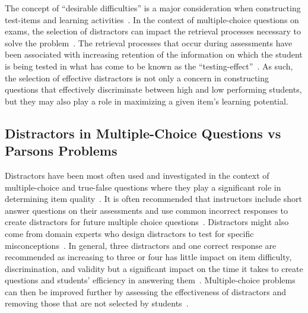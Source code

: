 \documentclass[authorversion,nonacm]{acmart}
\begin{document}
The concept of ``desirable difficulties'' is a major consideration when
constructing test-items and learning activities~\cite{bjork2011making,
bjork2014multiple}.  In the context of multiple-choice questions on exams, the
selection of distractors can impact the retrieval processes necessary to solve
the problem~\cite{little2015optimizing}. The retrieval processes that occur 
during assessments have been associated with increasing retention of the
information on which the student is being tested in what has come to be known
as the ``testing-effect''~\cite{izawa1966reinforcement, rowland2014effect}.  As
such, the selection of effective distractors is not only a concern in
constructing questions that effectively discriminate between high and low
performing students, but they may also play a role in maximizing a given item's
learning potential.

\subsection{Distractors in Multiple-Choice Questions vs Parsons Problems}

Distractors have been most often used and investigated in the context of
multiple-choice and true-false questions where they play a significant role in
determining item quality~\cite{gierl2017developing}. It is often recommended
that instructors include short answer questions on their assessments and use
common incorrect responses to create distractors for future multiple choice
questions~\cite{briggs2006diagnostic}.  Distractors might also come from domain
experts who design distractors to test for specific
misconceptions~\cite{guttman1967systematic}. In general, three distractors and
one correct response are recommended as increasing to three or four has little
impact on item difficulty, discrimination, and validity but a significant impact
on the time it takes to create questions and students' efficiency in answering
them~\cite{vyas2008multiple}. Multiple-choice problems can then be improved
further by assessing the effectiveness of distractors and removing those that
are not selected by students~\cite{tarrant2009assessment}.

\end{document}
